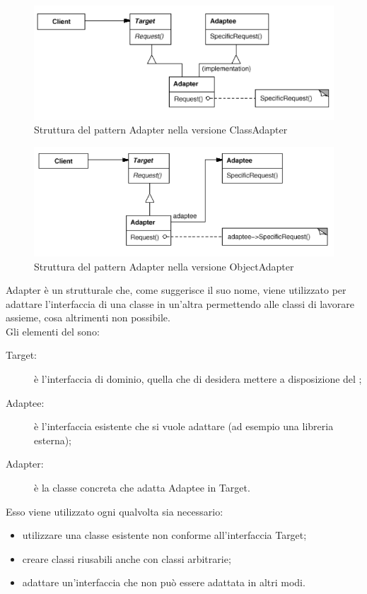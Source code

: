  \label{app:adapter}
	\begin{figure}[H]\centering
    \includegraphics[scale=0.7]{SpecificaTecnica/Pics/ClassAdapter}
    \caption{Struttura del pattern Adapter nella versione ClassAdapter}
	\end{figure}
	\begin{figure}[H]\centering
    \includegraphics[scale=0.7]{SpecificaTecnica/Pics/ObjectAdapter}
    \caption{Struttura del pattern Adapter nella versione ObjectAdapter}
	\end{figure}
	Adapter è un  strutturale che, come suggerisce il suo nome, viene utilizzato per adattare l'interfaccia di una classe in un'altra permettendo alle classi di lavorare assieme, cosa altrimenti non possibile.\\
	Gli elementi del  sono:
	\begin{description}
		\item[Target:] è l'interfaccia di dominio, quella che di desidera mettere a disposizione del ;
		\item[Adaptee:] è l'interfaccia esistente che si vuole adattare (ad esempio una libreria esterna);
		\item[Adapter:] è la classe concreta che adatta Adaptee in Target.
	\end{description}
	Esso viene utilizzato ogni qualvolta sia necessario:
	\begin{itemize}
		\item utilizzare una classe esistente non conforme all'interfaccia Target;
		\item creare classi riusabili anche con classi arbitrarie;
		\item adattare un'interfaccia che non può essere adattata in altri modi.
	\end{itemize}
